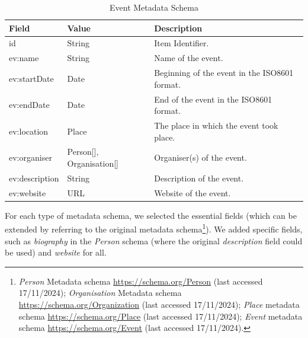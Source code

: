 \begin{longtable}{|p{}|p{}|p{}|}
    \caption{Event Metadata Schema} \label{tab:c4-event} \\
    \hline
    \textbf{Field} & \textbf{Value} & \textbf{Description} \\
    \hline

    \scriptsize id                      & \scriptsize String                                            &  \scriptsize Item Identifier. \\
    \hline
    \scriptsize ev:name                  & \scriptsize String                                            &  \scriptsize Name of the event. \\
    \hline
    \scriptsize ev:startDate             & \scriptsize Date                                              &  \scriptsize Beginning of the event in the ISO8601 format. \\
    \hline
    \scriptsize ev:endDate               & \scriptsize Date                                              &  \scriptsize End of the event in the ISO8601 format. \\
    \hline
    \scriptsize ev:location              & \scriptsize \textcolor{uniudColor3}{Place}                    &  \scriptsize The place in which the event took place. \\
    \hline
    \scriptsize ev:organiser             & \scriptsize \textcolor{uniudColor3}{Person[]}, \textcolor{uniudColor3}{Organisation[]}   &  \scriptsize Organiser(s) of the event. \\
    \hline
    \scriptsize ev:description           & \scriptsize String                                            &  \scriptsize Description of the event. \\
    \hline
    \scriptsize ev:website                 & \scriptsize URL                                              & \scriptsize  Website of the event. \\
    \hline

\end{longtable}

For each type of metadata schema, we selected the essential fields (which can be extended by referring to the original metadata schema\footnote{\textit{Person} Metadata schema \url{https://schema.org/Person} (last accessed 17/11/2024); \textit{Organisation} Metadata schema \url{https://schema.org/Organization} (last accessed 17/11/2024); \textit{Place} metadata schema \url{https://schema.org/Place} (last accessed 17/11/2024); \textit{Event} metadata schema \url{https://schema.org/Event} (last accessed 17/11/2024).}). We added specific fields, such as \textit{biography} in the \textit{Person} schema (where the original \textit{description} field could be used) and \textit{website} for all.

